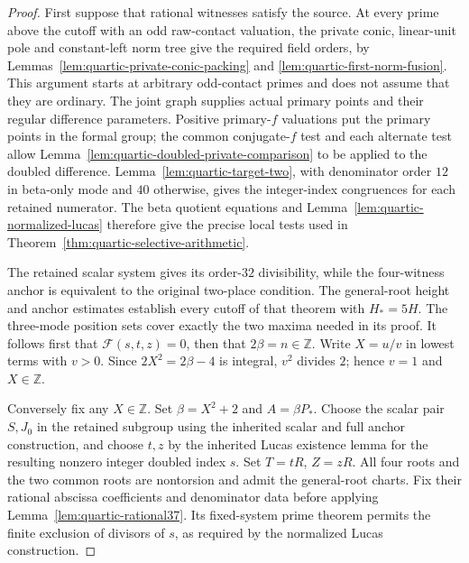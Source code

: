 \documentclass[11pt]{article}
\theoremstyle{definition}
\theoremstyle{remark}
\newcommand{\Z}{\mathbb Z}
\begin{document}
\begin{proof}
First suppose that rational witnesses satisfy the source. At every prime
above the cutoff with an odd raw-contact valuation, the private conic,
linear-unit pole and constant-left norm tree give the required field
orders, by Lemmas~\ref{lem:quartic-private-conic-packing} and
\ref{lem:quartic-first-norm-fusion}. This argument starts at arbitrary
odd-contact primes and does not assume that they are ordinary. The joint
graph supplies actual primary points and their regular difference
parameters. Positive primary-$f$ valuations put the primary points in the
formal group; the common conjugate-$f$ test and each alternate test allow
Lemma~\ref{lem:quartic-doubled-private-comparison} to be applied to the
doubled difference. Lemma~\ref{lem:quartic-target-two}, with denominator
order $12$ in beta-only mode and $40$ otherwise, gives the integer-index
congruences for each retained numerator. The beta quotient equations and
Lemma~\ref{lem:quartic-normalized-lucas} therefore give the precise local
tests used in Theorem~\ref{thm:quartic-selective-arithmetic}.

The retained scalar system gives its order-$32$ divisibility, while the
four-witness anchor is equivalent to the original two-place condition.
The general-root height and anchor estimates establish every cutoff of
that theorem with $H_*=5H$. The three-mode position sets cover exactly
the two maxima needed in its proof. It follows first that
$\mathcal F(s,t,z)=0$, then that $2\beta=n\in\Z$. Write $X=u/v$ in
lowest terms with $v>0$. Since $2X^2=2\beta-4$ is integral, $v^2$ divides
$2$; hence $v=1$ and $X\in\Z$.

Conversely fix any $X\in\Z$. Set $\beta=X^2+2$ and $A=\beta P_*$.
Choose the scalar pair $S,J_0$ in the retained subgroup using the
inherited scalar and full anchor construction, and choose $t,z$ by the
inherited Lucas existence lemma for the resulting nonzero integer doubled
index $s$. Set $T=tR$, $Z=zR$. All four roots and the two common roots
are nontorsion and admit the general-root charts. Fix their rational
abscissa coefficients and denominator data before applying
Lemma~\ref{lem:quartic-rational37}. Its fixed-system prime theorem permits
the finite exclusion of divisors of $s$, as required by the normalized
Lucas construction.


\end{proof}
\end{document}
